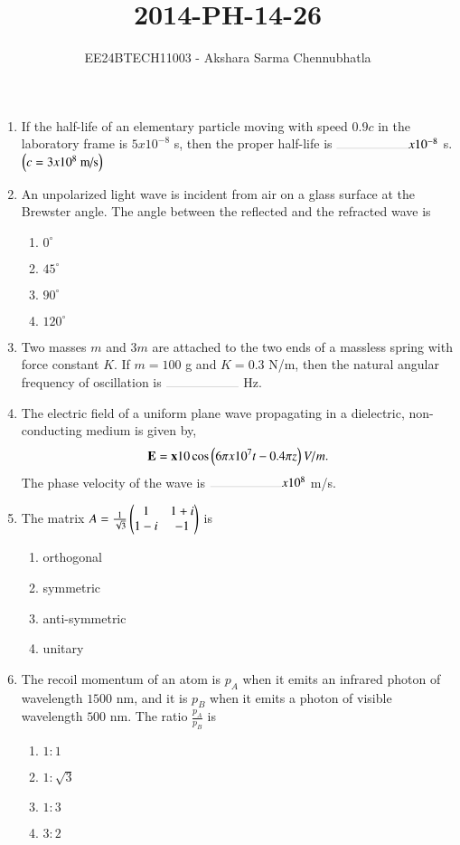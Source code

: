 \documentclass[journal,12pt,onecolumn]{IEEEtran}
\theoremstyle{remark}
\begin{document}

\title{2014-PH-14-26}
\author{EE24BTECH11003 - Akshara Sarma Chennubhatla}
\maketitle
\begin{enumerate}

\item If the half-life of an elementary particle moving with speed $0.9c$ in the laboratory frame is $5 x 10^{-8}$ s, then the proper half-life is $\rule{2cm}{0.1pt} x 10^{-8}$ s. $\left(c=3 x 10^8 \text{ m/s}\right)$

\item An unpolarized light wave is incident from air on a glass surface at the Brewster angle. The angle between the reflected and the refracted wave is
\begin{enumerate}
\item $0^{\circ}$
\item $45^{\circ}$
\item $90^{\circ}$
\item $120^{\circ}$
\end{enumerate}

\item Two masses $m$ and $3m$ are attached to the two ends of a massless spring with force constant $K$. If $m=100$ g and $K=0.3$ N/m, then the natural angular frequency of oscillation is $\rule{2cm}{0.1pt}$ Hz.

\item The electric field of a uniform plane wave propagating in a dielectric, non-conducting medium is given by,
\begin{align*}
\mathbf{E} = \mathbf{x}10\cos\left(6\pi x 10^7t - 0.4\pi z\right)V/m. 
\end{align*}
The phase velocity of the wave is $\rule{2cm}{0.1pt} x 10^8$ m/s.

\item The matrix $A = \frac{1}{\sqrt{3}}\begin{pmatrix}1 & 1+i\\1-i & -1\end{pmatrix}$ is
\begin{enumerate}
\item orthogonal
\item symmetric
\item anti-symmetric
\item unitary
\end{enumerate}

\item The recoil momentum of an atom is $p_A$ when it emits an infrared photon of wavelength $1500$ nm, and it is $p_B$ when it emits a photon of visible wavelength $500$ nm. The ratio $\frac{p_A}{p_B}$ is
\begin{enumerate}
\item $1:1$
\item $1:\sqrt{3}$
\item $1:3$
\item $3:2$
\end{enumerate}


\end{enumerate}
\end{document}
